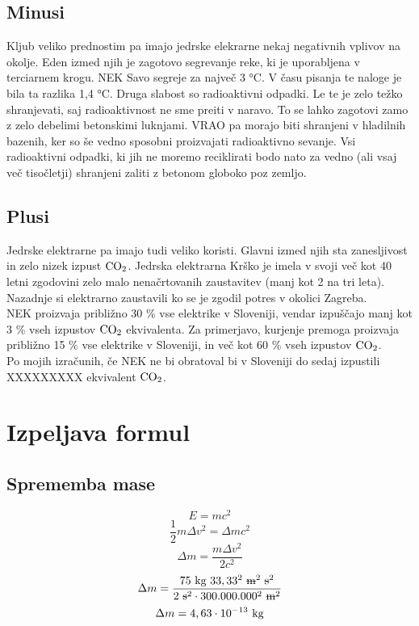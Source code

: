 \documentclass[a4paper,12pt]{article}
\begin{document}
\subsection{Minusi}
Kljub veliko prednostim pa imajo jedrske elekrarne nekaj negativnih vplivov na okolje. Eden izmed njih je zagotovo segrevanje reke, ki je uporabljena v terciarnem krogu. NEK Savo segreje za največ 3 °C. V času pisanja te naloge je bila ta razlika 1,4 °C. 
Druga slabost so radioaktivni odpadki. Le te je zelo težko shranjevati, saj radioaktivnost ne sme preiti v naravo. To se lahko zagotovi zamo z zelo debelimi betonskimi luknjami. VRAO pa morajo biti shranjeni v hladilnih bazenih, ker so še vedno sposobni proizvajati radioaktivno sevanje. Vsi radioaktivni odpadki, ki jih ne moremo reciklirati bodo nato za vedno (ali vsaj več tisočletji) shranjeni zaliti z betonom globoko poz zemljo.
\subsection{Plusi}
Jedrske elektrarne pa imajo tudi veliko koristi. Glavni izmed njih sta zanesljivost in zelo nizek izpust $\textnormal{CO}_2$. Jedrska elektrarna Krško je imela v svoji več kot 40 letni zgodovini zelo malo nenačrtovanih zaustavitev (manj kot 2 na tri leta). Nazadnje si elektrarno zaustavili ko se je zgodil potres v okolici Zagreba. \\
NEK proizvaja približno 30 \% vse elektrike v Sloveniji, vendar izpuščajo manj kot 3 \% vseh izpustov $\textnormal{CO}_2$ ekvivalenta. Za primerjavo, kurjenje premoga proizvaja približno 15 \% vse elektrike v Sloveniji, in več kot 60 \% vseh izpustov $\textnormal{CO}_2$.\\
Po mojih izračunih, če NEK ne bi obratoval bi v Sloveniji do sedaj izpustili XXXXXXXXX ekvivalent $\textnormal{CO}_2$.

\newpage
\section{Izpeljava formul}
\subsection{Sprememba mase}
$$E = mc^2$$
$$\frac{1}{2}m \Delta v^2 = \Delta m c^2$$
$$\Delta m = \frac{m \Delta v^2}{2 c^2}$$
$$\Delta m = \frac{75 \textnormal{ kg} \textnormal{ } 33,33^2 \textnormal{ } \textnormal{\sout{m}}^2 \textnormal{ } \textnormal{\sout{s}}^2}{2 \textnormal{ } \textnormal{\sout{s}}^2 \cdot 300.000.000^2 \textnormal{ } \textnormal{\sout{m}}^2 }$$
$$\Delta m = 4,63 \cdot 10^{-13} \textnormal { kg}$$
\end{document}
